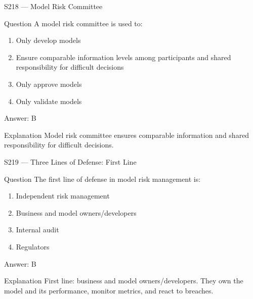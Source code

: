 \documentclass[aspectratio=169,8pt]{beamer}
\begin{document}
\begin{frame}{S218 --- Model Risk Committee}
	\begin{block}{Question}
		A model risk committee is used to:
		\begin{enumerate}
			\item Only develop models
			\item Ensure comparable information levels among participants and shared responsibility for difficult decisions
			\item Only approve models
			\item Only validate models
		\end{enumerate}
	\end{block}
	\begin{exampleblock}{Answer: B}\end{exampleblock}
	\begin{block}{Explanation}
		Model risk committee ensures comparable information and shared responsibility for difficult decisions.
	\end{block}
\end{frame}

\begin{frame}{S219 --- Three Lines of Defense: First Line}
	\begin{block}{Question}
		The first line of defense in model risk management is:
		\begin{enumerate}
			\item Independent risk management
			\item Business and model owners/developers
			\item Internal audit
			\item Regulators
		\end{enumerate}
	\end{block}
	\begin{exampleblock}{Answer: B}\end{exampleblock}
	\begin{block}{Explanation}
		First line: business and model owners/developers. They own the model and its performance, monitor metrics, and react to breaches.
	\end{block}
\end{frame}
\end{document}
